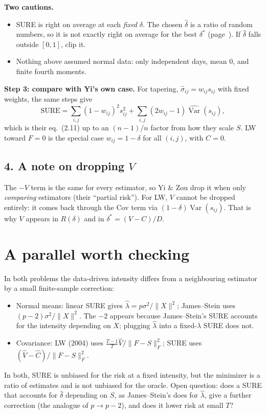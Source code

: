 \documentclass[12pt]{article}
\begin{document}
\textbf{Two cautions.}
\begin{itemize}
\item SURE is right on average at each \emph{fixed} $\delta$. The chosen $\hat\delta$ is a ratio of random numbers, so it is
not exactly right on average for the best $\delta^*$ (page~\pageref{pg:parallel}). If $\hat\delta$ falls outside $[0,1]$, clip it.
\item Nothing above assumed normal data: only independent days, mean $0$, and finite fourth moments.
\end{itemize}

\textbf{Step 3: compare with Yi's own case.} For tapering, $\hat\sigma_{ij}=w_{ij}s_{ij}$ with fixed weights, the same
steps give
\[
\mathrm{SURE}=\sum_{i,j}(1-w_{ij})^2s_{ij}^2+\sum_{i,j}(2w_{ij}-1)\widehat{\operatorname{Var}}(s_{ij}),
\]
which is their eq.~(2.11) up to an $(n-1)/n$ factor from how they scale $S$. LW toward $F=0$ is the special
case $w_{ij}=1-\delta$ for all $(i,j)$, with $C=0$.

\subsection*{4. A note on dropping $V$}
The $-V$ term is the same for every estimator, so Yi \& Zou drop it when only \emph{comparing} estimators
(their ``partial risk''). For LW, $V$ cannot be dropped entirely: it comes back through the Cov term via
$(1-\delta)\operatorname{Var}(s_{ij})$. That is why $V$ appears in $R(\delta)$ and in $\delta^*=(V-C)/D$.

\newpage
\section*{A parallel worth checking}\label{pg:parallel}
In both problems the data-driven intensity differs from a neighbouring estimator by a small finite-sample
correction:
\begin{itemize}
\item Normal means: linear SURE gives $\hat\lambda=p\sigma^2/\|X\|^2$; James--Stein uses $(p-2)\sigma^2/\|X\|^2$.
The $-2$ appears because James--Stein's SURE accounts for the intensity depending on $X$; plugging
$\hat\lambda$ into a fixed-$\lambda$ SURE does not.
\item Covariance: LW (2004) uses $\frac{T-1}{T}\hat V/\|F-S\|_F^2$; SURE uses $(\hat V-\hat C)/\|F-S\|_F^2$.
\end{itemize}
In both, SURE is unbiased for the risk at a fixed intensity, but the minimizer is a ratio of estimates and
is not unbiased for the oracle. Open question: does a SURE that accounts for $\hat\delta$ depending on $S$,
as James--Stein's does for $\hat\lambda$, give a further correction (the analogue of $p\to p-2$), and does it
lower risk at small $T$?
\end{document}
